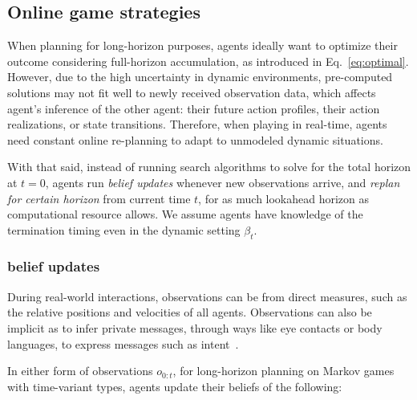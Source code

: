 \documentclass[letterpaper, 10 pt, conference]{ieeeconf}  %
\newcommand{\argmax}{\arg\!\!\max}
\begin{document}
\subsection{Online game strategies}
When planning for long-horizon purposes, agents ideally 
want to optimize their outcome considering full-horizon accumulation, as introduced in 
Eq.~\ref{eq:optimal}. However, due to the high uncertainty in dynamic 
environments, pre-computed solutions may not fit well to newly received 
observation data, which affects agent's inference of the other 
agent: their future action profiles, their action realizations, or state transitions. Therefore, when 
playing in real-time, agents need constant online re-planning to adapt 
to unmodeled dynamic situations. 

With that said, instead of running search algorithms to solve for the total 
horizon at $t=0$, agents run \textit{belief updates} whenever new 
observations arrive, and 
\textit{replan for certain horizon} from current time $t$, for as much 
lookahead horizon as computational resource allows. 
We assume agents have knowledge of the termination timing even in the dynamic setting $\beta_t$. 
\subsubsection{belief updates}\label{sec:belief_update}
During real-world interactions, observations can be from direct measures, such as 
the relative positions and velocities of all agents. Observations can also 
be implicit as to infer private messages, through ways like eye contacts or body 
languages, to express messages such as intent~\cite{knepper2017implicit}.

In either form of observations $o_{0:t}$, for long-horizon planning on 
Markov games with time-variant types, agents 
update their beliefs of the following:
\end{document}
